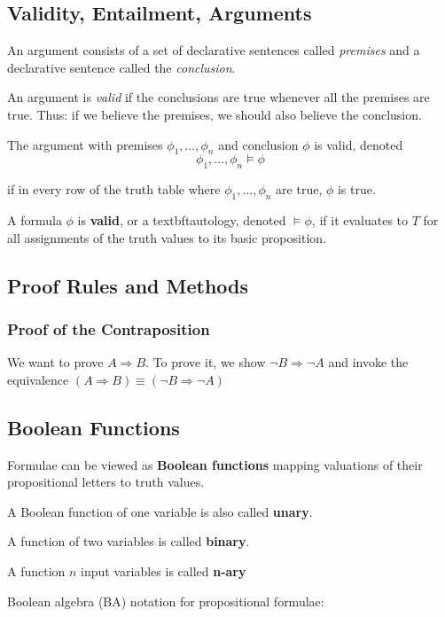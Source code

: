 \documentclass{ctexart}
\begin{document}
\subsection{Validity, Entailment, Arguments}

An argument consists of a set of declarative sentences called \textit{premises} and a declarative sentence called the \textit{conclusion}.

An argument is \textit{valid} if the conclusions are true whenever all the premises are true. 
Thus: if we believe the premises, we should also believe the conclusion.

The argument with premises $\phi_1,\ldots,\phi_n$ and conclusion $\phi$ is valid, denoted
\[
    \phi_1, \ldots, \phi_n \models \phi
\]

if in every row of the truth table where $\phi_1,\ldots, \phi_n$ are true, $\phi$ is true.

A formula $\phi$ is \textbf{valid}, or a textbf{tautology}, denoted $\models \phi$, if it evaluates to $T$ for all assignments of the truth values to its basic proposition.

\subsection{Proof Rules and Methods}
\subsubsection{Proof of the Contraposition}

We want to prove $A \Rightarrow B$. To prove it, we show $\lnot B \Rightarrow \lnot A$ and invoke the equivalence $(A \Rightarrow B) \equiv (\lnot B \Rightarrow \lnot A)$

\subsection{Boolean Functions}

Formulae can be viewed as \textbf{Boolean functions} mapping valuations of their propositional letters to truth values.

A Boolean function of one variable is also called \textbf{unary}.

A function of two variables is called \textbf{binary}.

A function $n$ input variables is called \textbf{n-ary}

Boolean algebra (BA) notation for propositional formulae:
\end{document}
